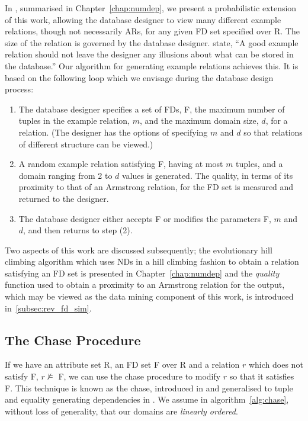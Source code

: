 In \cite{cl98c}, summarised in Chapter~\ref{chap:numdep}, we present
 a probabilistic extension of this work, 
 allowing the database designer to view many different example
 relations, though not necessarily ARs, for any given FD set specified
 over R. The size of the relation is governed by the database designer.
 \cite{mr86} state,  ``A good example
 relation should not leave the designer any illusions about what can
 be stored in the database.'' Our algorithm for generating example
 relations achieves this. It is based on the following loop
which we envisage during the database design process:
\begin{enumerate}
\item The database designer specifies a set of FDs, F, 
 the maximum number of tuples in the example relation, $m$, and
the maximum domain size, $d$, for a relation. (The designer
has the options of specifying $m$ and $d$ so that relations
of different structure can be viewed.)
\item A random example relation satisfying F, 
having at most $m$ tuples, and a domain ranging
from 2 to $d$ values is generated. The quality,
in terms of its proximity to that of an Armstrong relation, for the 
FD set is measured and returned to the designer.
\item The database designer either accepts F or modifies the parameters
F, $m$ and $d$, 
and then returns to step (2).
\end{enumerate}

Two aspects of this work are discussed subsequently; the
evolutionary hill climbing algorithm which uses NDs in a hill climbing
fashion to obtain a relation satisfying an FD set is presented in
Chapter~\ref{chap:numdep} and the {\em
quality} function used to obtain a proximity to an Armstrong relation
for the output, which may be viewed as the data mining component of
this work, is introduced in~\ref{subsec:rev_fd_sim}.

\subsection{The Chase Procedure}\label{subsec:rev_chase}

If we have an attribute set R, an FD set F over R and a relation
$r$ which does not satisfy F, $r \not\models$ F, we can use the
chase procedure to modify $r$ so that it satisfies F. This technique
is known as the chase, introduced in \cite{mms79} and generalised 
to tuple and equality generating dependencies in \cite{bv84}. We
assume in algorithm~\ref{alg:chase}, without
loss of generality,  that our
domains are {\em linearly ordered}.

